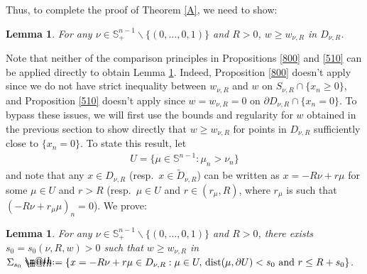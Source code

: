 \documentclass[12pt]{article}
\makeatletter
\numberwithin{equation}{section}
\theoremstyle{plain}
\newtheorem{lem}[thm]{Lemma}
\theoremstyle{definition}
\newcommand*{\defeq}{\mathrel{\rlap{%
			\raisebox{0.3ex}{$\m@th\cdot$}}%
		\raisebox{-0.3ex}{$\m@th\cdot$}}%
	=}
\makeatother
\begin{document}
Thus, to complete the proof of Theorem \ref{A}, we need to show:

\begin{lem}\label{19}
	For any $\nu\in\mathbb{S}_+^{n-1}\backslash\{(0,\dots,0,1)\}$ and $R>0$, $w \geq w_{\nu,R}$ in $D_{\nu,R}$. 
\end{lem}

Note that neither of the comparison principles in Propositions \ref{800} and \ref{510} can be applied directly to obtain Lemma \ref{19}. Indeed, Proposition \ref{800} doesn't apply since we do not have strict inequality between $w_{\nu,R}$ and $w$ on $S_{\nu,R}\cap \{x_n\geq 0\}$, and Proposition \ref{510} doesn't apply since $w = w_{\nu,R} = 0$ on $\partial D_{\nu,R} \cap \{x_n=0\}$. To bypass these issues, we will first use the bounds and regularity for $w$ obtained in the previous section to show directly that $w \geq w_{\nu,R}$ for points in $D_{\nu,R}$ sufficiently close to $\{x_n=0\}$. To state this result, let 
\begin{align*}
U = \{\mu\in\mathbb{S}^{n-1}:\mu_n > \nu_n\}
\end{align*}
and note that any $x\in D_{\nu,R}$ (resp.~$x\in\widetilde{D}_{\nu,R}$) can be written as $x = -R\nu  + r\mu$ for some $\mu\in U$ and $r > R$ (resp.~$\mu\in U$ and $r\in(r_\mu, R)$, where $r_\mu$ is such that $(-R\nu  + r_\mu \mu)_n =0$). We prove: 

\begin{lem}\label{16}
	For any $\nu\in\mathbb{S}_+^{n-1}\backslash\{(0,\dots,0,1)\}$ and $R>0$, there exists $s_0 = s_0(\nu,R,w)>0$ such that $w \geq w_{\nu,R}$ in $\Sigma_{s_0} \defeq \{x = -R\nu  + r\mu\in D_{\nu,R}: \mu\in U,\, \operatorname{dist}(\mu,\partial U)<s_0 \text{ and } r \leq R+s_0\}$.
\end{lem}
\end{document}
